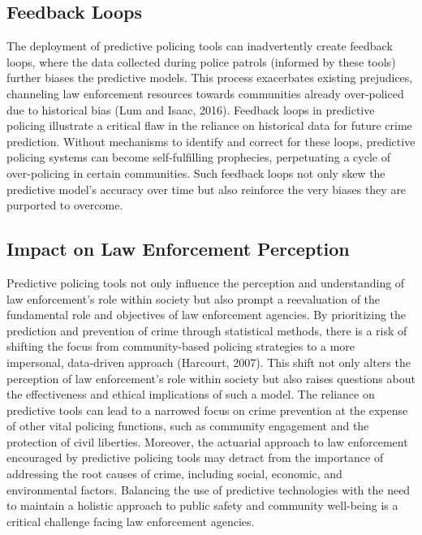 \documentclass[man, noextraspace]{apa7} %
\begin{document}
\subsection{Feedback Loops}

The deployment of predictive policing tools can inadvertently create feedback loops, where the data collected during police patrols (informed by these tools) further biases the predictive models. This process exacerbates existing prejudices, channeling law enforcement resources towards communities already over-policed due to historical bias (Lum and Isaac, 2016). Feedback loops in predictive policing illustrate a critical flaw in the reliance on historical data for future crime prediction. Without mechanisms to identify and correct for these loops, predictive policing systems can become self-fulfilling prophecies, perpetuating a cycle of over-policing in certain communities. Such feedback loops not only skew the predictive model's accuracy over time but also reinforce the very biases they are purported to overcome. 

 

\subsection{Impact on Law Enforcement Perception}
Predictive policing tools not only influence the perception and understanding of law enforcement's role within society but also prompt a reevaluation of the fundamental role and objectives of law enforcement agencies. By prioritizing the prediction and prevention of crime through statistical methods, there is a risk of shifting the focus from community-based policing strategies to a more impersonal, data-driven approach (Harcourt, 2007). This shift not only alters the perception of law enforcement's role within society but also raises questions about the effectiveness and ethical implications of such a model. The reliance on predictive tools can lead to a narrowed focus on crime prevention at the expense of other vital policing functions, such as community engagement and the protection of civil liberties. Moreover, the actuarial approach to law enforcement encouraged by predictive policing tools may detract from the importance of addressing the root causes of crime, including social, economic, and environmental factors. Balancing the use of predictive technologies with the need to maintain a holistic approach to public safety and community well-being is a critical challenge facing law enforcement agencies. 
\end{document}
